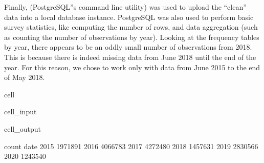 \documentclass[letterpaper,10pt,english]{jupyterBook}
\begin{document}
\sphinxAtStartPar
Finally,  (PostgreSQL”s command line utility) was used to upload the “clean” data into a local database instance. PostgreSQL was also used to perform basic survey statistics, like computing the number of rows, and data aggregation (such as counting the number of observations by year). Looking at the frequency tables by year, there appears to be an oddly small number of observations from 2018. This is because there is indeed missing data from June 2018 until the end of the year. For this reason, we chose to work only with data from June 2015 to the end of May 2018.

\begin{sphinxuseclass}{cell}
\begin{sphinxuseclass}{cell_input}
\begin{sphinxVerbatim}[commandchars=\\\{\}]
   
      

      


\end{sphinxVerbatim}

\end{sphinxuseclass}
\begin{sphinxuseclass}{cell_output}
\begin{sphinxVerbatim}[commandchars=\\\{\}]
        count
date         
2015  1971891
2016  4066783
2017  4272480
2018  1457631
2019  2830566
2020  1243540
\end{sphinxVerbatim}

\end{sphinxuseclass}
\end{sphinxuseclass}
\end{document}
